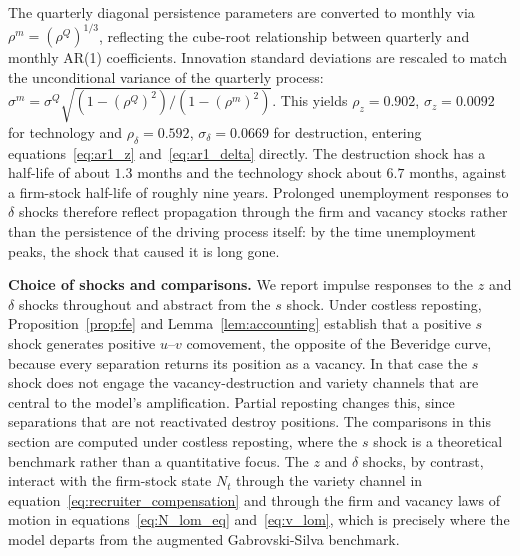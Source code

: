 \documentclass[authoryear, review, 12pt]{elsarticle}
\begin{document}
	The quarterly diagonal persistence parameters are converted to
	monthly via $\rho^m=(\rho^Q)^{1/3}$, reflecting the cube-root
	relationship between quarterly and monthly AR(1) coefficients.
	Innovation standard deviations are rescaled to match the
	unconditional variance of the quarterly process:
	$\sigma^m = \sigma^Q\sqrt{(1-(\rho^Q)^2)/(1-(\rho^m)^2)}$.
	This yields $\rho_z=0.902$, $\sigma_z=0.0092$ for technology and
	$\rho_\delta=0.592$, $\sigma_\delta=0.0669$ for destruction,
	entering equations~\eqref{eq:ar1_z} and~\eqref{eq:ar1_delta}
	directly.
	The destruction shock has a half-life of about $1.3$ months and the
	technology shock about $6.7$ months, against a firm-stock half-life of
	roughly nine years.  Prolonged unemployment responses to $\delta$
	shocks therefore reflect propagation through the firm and vacancy
	stocks rather than the persistence of the driving process itself:
	by the time unemployment peaks, the shock that caused it is long gone.

	\medskip\noindent\textbf{Choice of shocks and comparisons.}
	We report impulse responses to the $z$ and $\delta$ shocks
	throughout and abstract from the $s$ shock.
	Under costless reposting, Proposition~\ref{prop:fe} and
	Lemma~\ref{lem:accounting} establish that a positive $s$ shock generates positive $u$--$v$
	comovement, the opposite of the Beveridge curve, because every
	separation returns its position as a vacancy. In that case the $s$
	shock does not engage the vacancy-destruction and variety channels
	that are central to the model's amplification. Partial reposting
	changes this, since separations that are not reactivated destroy
	positions. The comparisons in this section are computed under
	costless reposting, where the $s$ shock is a theoretical benchmark
	rather than a quantitative focus.
	The $z$ and $\delta$ shocks, by contrast, interact with the
	firm-stock state $N_t$ through the variety channel in
	equation~\eqref{eq:recruiter_compensation} and through the firm
	and vacancy laws of motion in equations~\eqref{eq:N_lom_eq}
	and~\eqref{eq:v_lom}, which is precisely where the model departs
	from the augmented Gabrovski-Silva benchmark.
\end{document}
